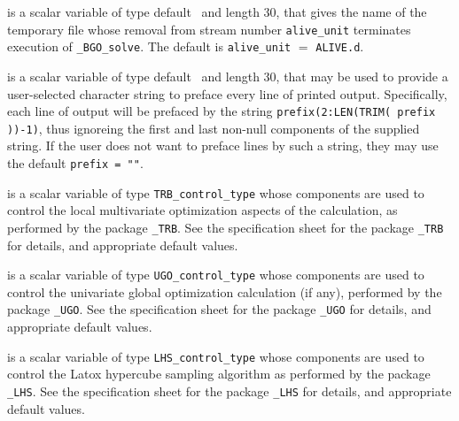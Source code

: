 \documentclass{galahad}
\newcommand{\packagename}{BGO}
\newcommand{\fullpackagename}{\libraryname\_\packagename}
\newcommand{\solver}{{\tt \fullpackagename\_solve}}
\begin{document}
\begin{description}
 is a scalar variable of type default \character\ and length
30, that gives the name of the temporary file whose removal from stream number
{\tt alive\_unit} terminates execution of \solver.
The default is {\tt alive\_unit} $=$ {\tt ALIVE.d}.

 is a scalar variable of type default \character\
and length 30, that may be used to provide a user-selected
character string to preface every line of printed output.
Specifically, each line of output will be prefaced by the string
{\tt prefix(2:LEN(TRIM( prefix ))-1)},
thus ignoreing the first and last non-null components of the
supplied string. If the user does not want to preface lines by such
a string, they may use the default {\tt prefix = ""}.

 is a scalar variable of type
{\tt TRB\_control\_type}
whose components are used to control the local multivariate
optimization aspects of the calculation, as performed by the package
{\tt \libraryname\_TRB}.
See the specification sheet for the package
{\tt \libraryname\_TRB}
for details, and appropriate default values.

 is a scalar variable of type
{\tt UGO\_control\_type}
whose components are used to control the
univariate global optimization calculation (if any),
performed by the package
{\tt \libraryname\_UGO}.
See the specification sheet for the package
{\tt \libraryname\_UGO}
for details, and appropriate default values.

 is a scalar variable of type
{\tt LHS\_control\_type}
whose components are used to control the Latox hypercube sampling algorithm 
as performed by the package
{\tt \libraryname\_LHS}.
See the specification sheet for the package
{\tt \libraryname\_LHS}
for details, and appropriate default values.

\end{description}

\end{document}
